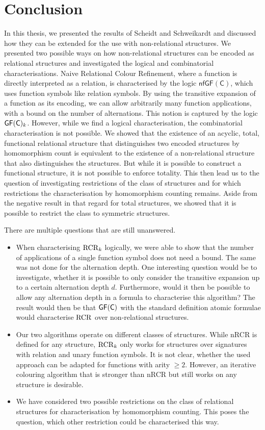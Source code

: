 \section{Conclusion}

In this thesis, we presented the results of Scheidt and Schweikardt \cite{scheidt2025ColorRefinement} and discussed how they can be extended for the use with non-relational structures.
We presented two possible ways on how non-relational structures can be encoded as relational structures and investigated the logical and combinatorial characterisations.
Naive Relational Colour Refinement, where a function is directly interpreted as a relation, is characterised by the logic $\mathsf{nfGF}(\mathsf C)$, which uses function symbols like relation symbols.
By using the transitive expansion of a function as its encoding, we can allow arbitrarily many function applications, with a bound on the number of alternations. 
This notion is captured by the logic $\mathsf{GF}(\mathsf{C})_k$.
However, while we find a logical characterisation, the combinatorial characterisation is not possible.
We showed that the existence of an acyclic, total, functional relational structure that distinguishes two encoded structures by homomorphism count is equivalent to the existence of a non-relational structure that also distinguishes the structures.
But while it is possible to construct a functional structure, it is not possible to enforce totality.
This then lead us to the question of investigating restrictions of the class of structures and for which restrictions the characterisation by homomorphism counting remains.
Aside from the negative result in that regard for total structures, we showed that it is possible to restrict the class to symmetric structures.

There are multiple questions that are still unanswered.
\begin{itemize}
	\item When characterising $\operatorname{RCR}_k$ logically, we were able to show that the number of applications of a single function symbol does not need a bound.
	The same was not done for the alternation depth.
	One interesting question would be to investigate, whether it is possible to only consider the transitive expansion up to a certain alternation depth $d$.
	Furthermore, would it then be possible to allow any alternation depth in a formula to characterise this algorithm?
	The result would then be that $\mathsf{GF}(\mathsf{C})$ with the standard definition atomic formulae would characterise $\operatorname{RCR}$ over non-relational structures.
	\item Our two algorithms operate on different classes of structures.
	While nRCR is defined for any structure, $\operatorname{RCR}_k$ only works for structures over signatures with relation and unary function symbols.
	It is not clear, whether the used approach can be adapted for functions with arity $\geq 2$.
	However, an iterative colouring algorithm that is stronger than nRCR but still works on any structure is desirable.
	\item We have considered two possible restrictions on the class of relational structures for characterisation by homomorphism counting.
	This poses the question, which other restriction could be characterised this way.
\end{itemize}

